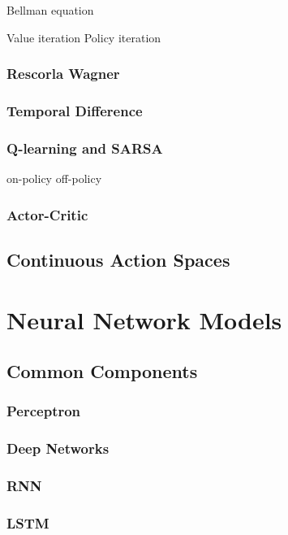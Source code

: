 \documentclass[]{article}
\begin{document}
Bellman equation

Value iteration Policy iteration

\section{Rescorla Wagner}

\section{Temporal Difference}

\section{Q-learning and SARSA}

on-policy off-policy

\section{Actor-Critic}

\chapter{Continuous Action Spaces}

\part{Neural Network Models}

\chapter{Common Components}

\section{Perceptron}

\section{Deep Networks}

\section{RNN}

\section{LSTM}
\end{document}
